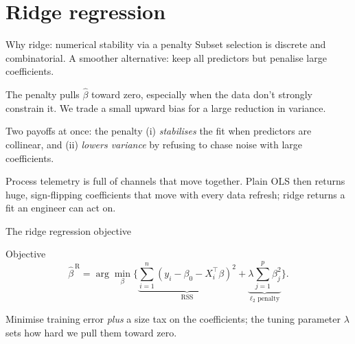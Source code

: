 \documentclass[aspectratio=169,11pt]{beamer}
\begin{document}
\section{Ridge regression}

\begin{frame}{Why ridge: numerical stability via a penalty}
  Subset selection is discrete and combinatorial. A smoother
  alternative: keep all predictors but penalise large coefficients.
  \begin{takeaway}[Intuition]
    The penalty pulls $\hat\beta$ toward zero, especially when the
    data don't strongly constrain it. We trade a small upward bias
    for a large reduction in variance.
  \end{takeaway}
  \begin{readme}
    Two payoffs at once: the penalty (i) \emph{stabilises} the fit when
    predictors are collinear, and (ii) \emph{lowers variance} by
    refusing to chase noise with large coefficients.
  \end{readme}
  \begin{industry}
    Process telemetry is full of channels that move together. Plain OLS
    then returns huge, sign-flipping coefficients that move with every
    data refresh; ridge returns a fit an engineer can act on.
  \end{industry}
\end{frame}

\begin{frame}{The ridge regression objective}
  \begin{block}{Objective}
    \[
      \boxed{\;
        \hat\beta^{\,\mathrm R} = \arg\min_{\beta}
        \biggl\{ \underbrace{\sum_{i=1}^n (y_i - \beta_0 - X_i^\top\beta)^2}_{\mathrm{RSS}}
                + \underbrace{\lambda \sum_{j=1}^p \beta_j^2}_{\ell_2 \text{ penalty}} \biggr\}.
      \;}
    \]
  \end{block}
  \begin{takeaway}
    Minimise training error \emph{plus} a size tax on the coefficients;
    the tuning parameter $\lambda$ sets how hard we pull them toward
    zero.
  \end{takeaway}
\end{frame}
\end{document}
